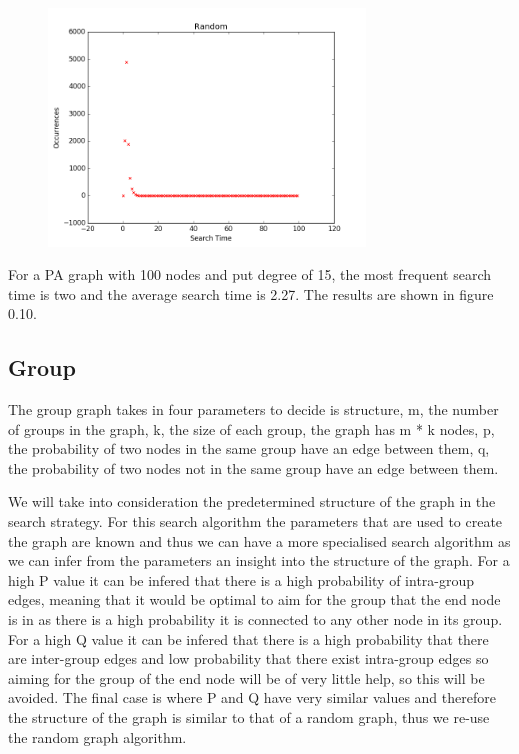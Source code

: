 \documentclass[paper=a4, fontsize=11pt]{scrartcl}
\numberwithin{equation}{section}		%
\numberwithin{figure}{section}			%
\numberwithin{table}{section}				%
\begin{document}
\begin{figure}[p]
\center
\caption{}
\includegraphics[width=0.75\textwidth]{pictures/paSearch.png}
\end{figure}

For a PA graph with 100 nodes and put degree of 15, the most frequent search time is two and the average search time is 2.27. The results are shown in figure 0.10.

\subsection*{Group}

The group graph takes in four parameters to decide is structure, m, the number of groups in the graph, k, the size of each group, the graph has m * k nodes, p, the probability of two nodes in the same group have an edge between them, q, the probability of two nodes not in the same group have an edge between them.

We will take into consideration the predetermined structure of the graph in the search strategy. For this search algorithm the parameters that are used to create the graph are known and thus we can have a more specialised search algorithm as we can infer from the parameters an insight into the structure of the graph. For a high P value it can be infered that there is a high probability of intra-group edges, meaning that it would be optimal to aim for the group that the end node is in as there is a high probability it is connected to any other node in its group. For a high Q value it can be infered that there is a high probability that there are inter-group edges and low probability that there exist intra-group edges so aiming for the group of the end node will be of very little help, so this will be avoided. The final case is where P and Q have very similar values and therefore the structure of the graph is similar to that of a random graph, thus we re-use the random graph algorithm.\\
\end{document}
